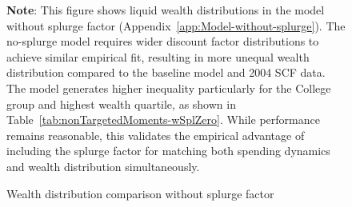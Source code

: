 \documentclass[\latexroot/\projectname]{subfiles}
\begin{document}
\begin{figure}[htb] %
  \centering
  \caption{\pregenmark Wealth distribution comparison without splurge factor}
  \whenintegrated{\label{fig:LorenzPtsSplZero}} %

  \medskip
  \noindent\parbox{\textwidth}{\footnotesize
    \textbf{Note}: This figure shows liquid wealth distributions in the model without splurge factor (Appendix~\ref{app:Model-without-splurge}).
    The no-splurge model requires wider discount factor distributions to achieve similar empirical fit,
    resulting in more unequal wealth distribution compared to the baseline model and 2004 SCF data.
    The model generates higher inequality particularly for the College group and highest wealth quartile,
    as shown in Table~\ref{tab:nonTargetedMoments-wSplZero}. While performance remains reasonable,
    this validates the empirical advantage of including the splurge factor for matching both spending
    dynamics and wealth distribution simultaneously.
  }
\end{figure}

\vspace{0.5em}

\smartbib
\end{document}
